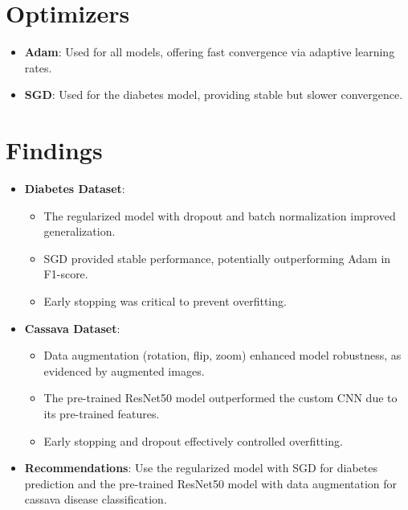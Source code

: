 \documentclass[a4paper,12pt]{article}
\begin{document}
\section*{Optimizers}
\begin{itemize}
    \item \textbf{Adam}: Used for all models, offering fast convergence via adaptive learning rates.
    \item \textbf{SGD}: Used for the diabetes model, providing stable but slower convergence.
\end{itemize}

\section*{Findings}
\begin{itemize}
    \item \textbf{Diabetes Dataset}:
    \begin{itemize}
        \item The regularized model with dropout and batch normalization improved generalization.
        \item SGD provided stable performance, potentially outperforming Adam in F1-score.
        \item Early stopping was critical to prevent overfitting.
    \end{itemize}
    \item \textbf{Cassava Dataset}:
    \begin{itemize}
        \item Data augmentation (rotation, flip, zoom) enhanced model robustness, as evidenced by augmented images.
        \item The pre-trained ResNet50 model outperformed the custom CNN due to its pre-trained features.
        \item Early stopping and dropout effectively controlled overfitting.
    \end{itemize}
    \item \textbf{Recommendations}: Use the regularized model with SGD for diabetes prediction and the pre-trained ResNet50 model with data augmentation for cassava disease classification.
\end{itemize}

\clearpage
\end{document}
